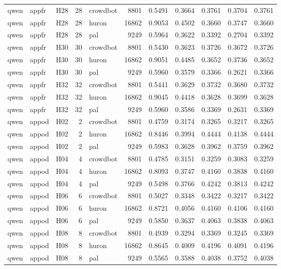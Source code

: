 \begin{table}[tbp]
\begin{tabular}{lllrlrrrrrr}
qwen & appfr & H28 & 28 & crowdbot & 8801 & 0.5491 & 0.3664 & 0.3761 & 0.3704 & 0.3761 \\
qwen & appfr & H28 & 28 & huron & 16862 & 0.9053 & 0.4502 & 0.3660 & 0.3747 & 0.3660 \\
qwen & appfr & H28 & 28 & pal & 9249 & 0.5964 & 0.3622 & 0.3392 & 0.2704 & 0.3392 \\
qwen & appfr & H30 & 30 & crowdbot & 8801 & 0.5430 & 0.3623 & 0.3726 & 0.3672 & 0.3726 \\
qwen & appfr & H30 & 30 & huron & 16862 & 0.9051 & 0.4485 & 0.3652 & 0.3736 & 0.3652 \\
qwen & appfr & H30 & 30 & pal & 9249 & 0.5960 & 0.3579 & 0.3366 & 0.2621 & 0.3366 \\
qwen & appfr & H32 & 32 & crowdbot & 8801 & 0.5441 & 0.3629 & 0.3732 & 0.3680 & 0.3732 \\
qwen & appfr & H32 & 32 & huron & 16862 & 0.9045 & 0.4418 & 0.3628 & 0.3699 & 0.3628 \\
qwen & appfr & H32 & 32 & pal & 9249 & 0.5960 & 0.3586 & 0.3369 & 0.2631 & 0.3369 \\
qwen & appod & H02 & 2 & crowdbot & 8801 & 0.4759 & 0.3174 & 0.3265 & 0.3217 & 0.3265 \\
qwen & appod & H02 & 2 & huron & 16862 & 0.8446 & 0.3994 & 0.4444 & 0.4138 & 0.4444 \\
qwen & appod & H02 & 2 & pal & 9249 & 0.5983 & 0.3628 & 0.3962 & 0.3759 & 0.3962 \\
qwen & appod & H04 & 4 & crowdbot & 8801 & 0.4785 & 0.3151 & 0.3259 & 0.3083 & 0.3259 \\
qwen & appod & H04 & 4 & huron & 16862 & 0.8093 & 0.3747 & 0.4160 & 0.3838 & 0.4160 \\
qwen & appod & H04 & 4 & pal & 9249 & 0.5498 & 0.3766 & 0.4242 & 0.3813 & 0.4242 \\
qwen & appod & H06 & 6 & crowdbot & 8801 & 0.5027 & 0.3348 & 0.3422 & 0.3217 & 0.3422 \\
qwen & appod & H06 & 6 & huron & 16862 & 0.8721 & 0.4056 & 0.4160 & 0.4106 & 0.4160 \\
qwen & appod & H06 & 6 & pal & 9249 & 0.5850 & 0.3637 & 0.4063 & 0.3838 & 0.4063 \\
qwen & appod & H08 & 8 & crowdbot & 8801 & 0.4939 & 0.3294 & 0.3369 & 0.3245 & 0.3369 \\
qwen & appod & H08 & 8 & huron & 16862 & 0.8645 & 0.4009 & 0.4196 & 0.4091 & 0.4196 \\
qwen & appod & H08 & 8 & pal & 9249 & 0.5565 & 0.3588 & 0.4038 & 0.3752 & 0.4038 \\

\end{tabular}
\end{table}
